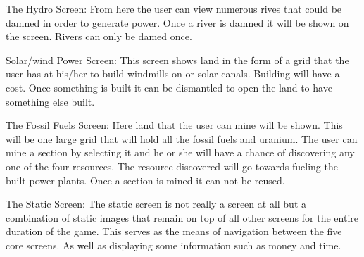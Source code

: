 \documentclass[msc,oneside]{ubcthesis}%
\begin{document}
\noindent The Hydro Screen: \newline
\indent From here the user can view numerous rives that could be damned in order to generate power. Once a 
river is damned it will be shown on the screen. Rivers can only be damed once. 
\bigskip

\noindent Solar/wind Power Screen: \newline
\indent This screen shows land in the form of a grid that the user has at his/her to build windmills on or 
solar canals. Building will have a cost. Once something is built it can be dismantled to open the land 
to have something else built. 
\bigskip


\noindent The Fossil Fuels Screen: \newline
\indent Here land that the user can mine will be shown. This will be one large grid that will hold all the 
fossil fuels and uranium. The user can mine a section by selecting it and he or she will have a chance 
of discovering any one of the four resources. The resource discovered will go towards fueling the built 
power plants. Once a section is mined it can not be reused. 
\bigskip

\noindent The Static Screen: \newline
\indent The static screen is not really a screen at all but a combination of static images that remain on 
top of all other screens for the entire duration of the game. This serves as the means of navigation 	
between the five core screens. As well as displaying some information such as money and time. 
\bigskip




\end{document}
